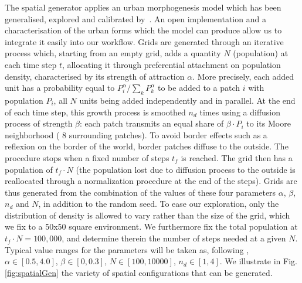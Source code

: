 \documentclass[preprint,5p,times,twocolumn,authoryear]{elsarticle}
\begin{document}
The spatial generator applies an urban morphogenesis model \citep{Batty2007} which has been generalised, explored and calibrated by~\citet{raimbault2018calibration}. An open implementation and a characterisation of the urban forms which the model can produce allow us to integrate it easily into our workflow. Grids are generated through an iterative process which, starting from an empty grid, adds a quantity $N$ (population) at each time step $t$, allocating it through preferential attachment on population density, characterised by its strength of attraction $\alpha$. More precisely, each added unit has a probability equal to $P_i^{\alpha}/\sum_k P_k^{\alpha}$ to be added to a patch $i$ with population $P_i$, all $N$ units being added independently and in parallel. At the end of each time step, this growth process is smoothed $n_d$ times using a diffusion process of strength $\beta$: each patch transmits an equal share of $\beta\cdot P_i$ to its Moore neighborhood ( 8 surrounding patches). To avoid border effects such as a reflexion on the border of the world, border patches diffuse to the outside. The procedure stops when a fixed number of steps $t_f$ is reached. The grid then has a population of $t_f \cdot N$ (the population lost due to diffusion process to the outside is reallocated through a normalization procedure at the end of the steps). Grids are thus generated from the combination of the values of these four  parameters $\alpha$, $\beta$, $n_d$ and $N$, in addition to the random seed. To ease our exploration, only the distribution of density is allowed to vary rather than the size of the grid, which we fix to a 50x50 square environment. We furthermore fix the total population at $t_f\cdot N = 100,000$, and determine therein the number of steps needed at a given $N$. Typical value ranges for the  parameters will be taken as, following \citet{raimbault2018calibration}, $\alpha\in\left[0.5,4.0\right]$, $\beta \in\left[0,0.3\right] $, $N\in \left[100,10000\right]$, $n_d\in\left[1,4\right]$. We illustrate in Fig.\ref{fig:spatialGen} the variety of spatial configurations that can be generated.
\end{document}
